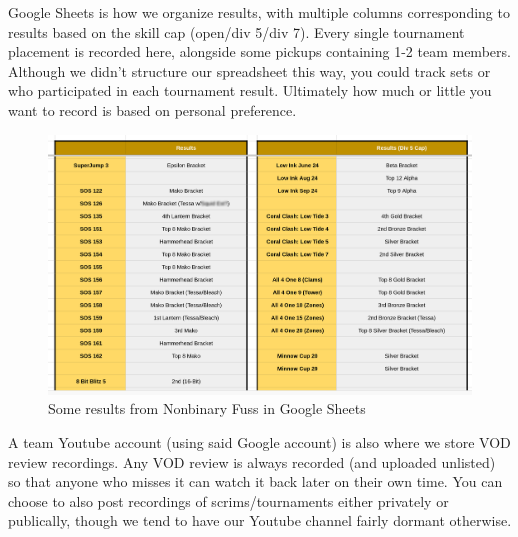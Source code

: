 \documentclass[12pt]{article}
\begin{document}
Google Sheets is how we organize results, with multiple columns corresponding to results based on the skill cap (open/div 5/div 7). Every single tournament placement is recorded here, alongside some pickups containing 1-2 team members. Although we didn't structure our spreadsheet this way, you could track sets or who participated in each tournament result. Ultimately how much or little you want to record is based on personal preference. 
\begin{figure}
    \centering
    \includegraphics[width=1\linewidth]{google_sheets.png}
\caption{Some results from Nonbinary Fuss in Google Sheets}
\end{figure}

A team Youtube account (using said Google account) is also where we store VOD review recordings. Any VOD review is always recorded (and uploaded unlisted) so that anyone who misses it can watch it back later on their own time. You can choose to also post recordings of scrims/tournaments either privately or publically, though we tend to have our Youtube channel fairly dormant otherwise.
\end{document}
